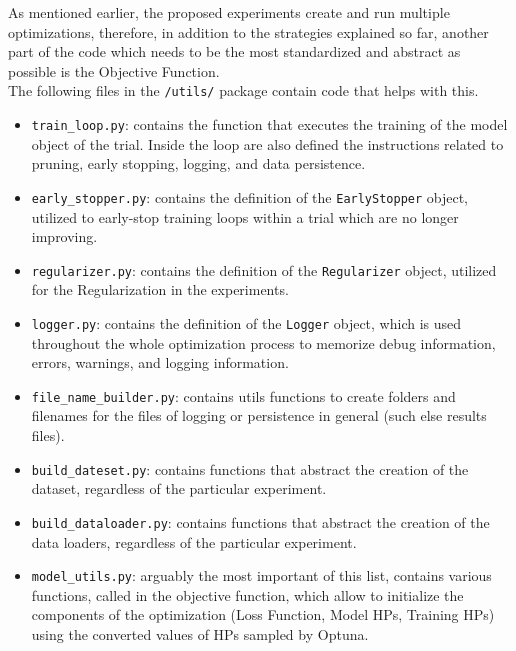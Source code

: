 As mentioned earlier, the proposed experiments create and run multiple optimizations, therefore, in addition to the strategies explained so far, another part of the code which needs to be the most standardized and abstract as possible is the Objective Function.
\\[0.3cm]The following files in the \texttt{/utils/} package contain code that helps with this.
\begin{itemize}[itemsep=0.1cm]
    \item \texttt{train\_loop.py}: contains the function that executes the training of the model object of the trial. Inside the loop are also defined the instructions related to pruning, early stopping, logging, and data persistence.
    \item \texttt{early\_stopper.py}: contains the definition of the \texttt{EarlyStopper} object, utilized to early-stop training loops within a trial which are no longer improving.
    \item \texttt{regularizer.py}: contains the definition of the \texttt{Regularizer} object, utilized for the Regularization in the experiments.
    \item \texttt{logger.py}: contains the definition of the \texttt{Logger} object, which is used throughout the whole optimization process to memorize debug information, errors, warnings, and logging information.
    \item \texttt{file\_name\_builder.py}: contains utils functions to create folders and filenames for the files of logging or persistence in general (such else results files).
    \item \texttt{build\_dateset.py}: contains functions that abstract the creation of the dataset, regardless of the particular experiment.
    \item \texttt{build\_dataloader.py}: contains functions that abstract the creation of the data loaders, regardless of the particular experiment.
    \item \texttt{model\_utils.py}: arguably the most important of this list, contains various functions, called in the objective function, which allow to initialize the components of the optimization (Loss Function, Model HPs, Training HPs) using the converted values of HPs sampled by Optuna.
\end{itemize}
% 
